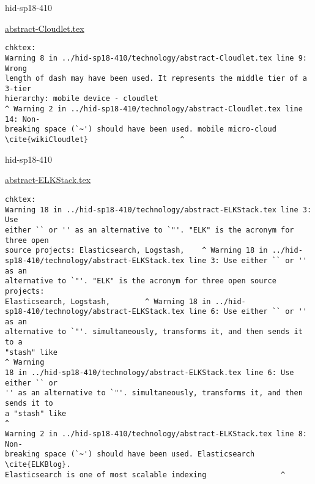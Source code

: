 

\begin{IU}

hid-sp18-410

\href{https://github.com/cloudmesh-community/hid-sp18-410/blob/master//technology/abstract-Cloudlet.tex}{abstract-Cloudlet.tex}

\begin{tiny}
\begin{verbatim}
chktex:
Warning 8 in ../hid-sp18-410/technology/abstract-Cloudlet.tex line 9: Wrong
length of dash may have been used. It represents the middle tier of a 3-tier
hierarchy: mobile device - cloudlet
^ Warning 2 in ../hid-sp18-410/technology/abstract-Cloudlet.tex line 14: Non-
breaking space (`~') should have been used. mobile micro-cloud
\cite{wikiCloudlet}                     ^
\end{verbatim}
\end{tiny}
\end{IU}



\begin{IU}

hid-sp18-410

\href{https://github.com/cloudmesh-community/hid-sp18-410/blob/master//technology/abstract-ELKStack.tex}{abstract-ELKStack.tex}

\begin{tiny}
\begin{verbatim}
chktex:
Warning 18 in ../hid-sp18-410/technology/abstract-ELKStack.tex line 3: Use
either `` or '' as an alternative to `"'. "ELK" is the acronym for three open
source projects: Elasticsearch, Logstash,    ^ Warning 18 in ../hid-
sp18-410/technology/abstract-ELKStack.tex line 3: Use either `` or '' as an
alternative to `"'. "ELK" is the acronym for three open source projects:
Elasticsearch, Logstash,        ^ Warning 18 in ../hid-
sp18-410/technology/abstract-ELKStack.tex line 6: Use either `` or '' as an
alternative to `"'. simultaneously, transforms it, and then sends it to a
"stash" like                                                          ^ Warning
18 in ../hid-sp18-410/technology/abstract-ELKStack.tex line 6: Use either `` or
'' as an alternative to `"'. simultaneously, transforms it, and then sends it to
a "stash" like                                                                ^
Warning 2 in ../hid-sp18-410/technology/abstract-ELKStack.tex line 8: Non-
breaking space (`~') should have been used. Elasticsearch \cite{ELKBlog}.
Elasticsearch is one of most scalable indexing                 ^
\end{verbatim}
\end{tiny}
\end{IU}

